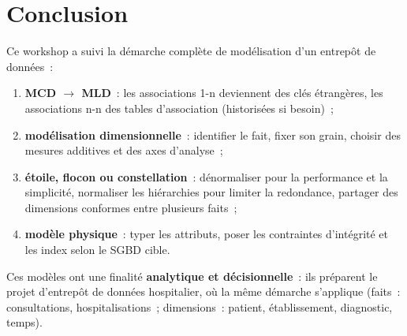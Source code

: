 \newpage
\section*{Conclusion}

\noindent Ce workshop a suivi la démarche complète de modélisation d'un entrepôt de données~:
\begin{enumerate}
	\item \textbf{MCD $\rightarrow$ MLD}~: les associations 1-n deviennent des clés étrangères, les associations n-n des tables d'association (historisées si besoin)~;
	\item \textbf{modélisation dimensionnelle}~: identifier le fait, fixer son grain, choisir des mesures additives et des axes d'analyse~;
	\item \textbf{étoile, flocon ou constellation}~: dénormaliser pour la performance et la simplicité, normaliser les hiérarchies pour limiter la redondance, partager des dimensions conformes entre plusieurs faits~;
	\item \textbf{modèle physique}~: typer les attributs, poser les contraintes d'intégrité et les index selon le SGBD cible.
\end{enumerate}

\noindent Ces modèles ont une finalité \textbf{analytique et décisionnelle}~: ils préparent le projet d'entrepôt de données hospitalier, où la même démarche s'applique (faits~: consultations, hospitalisations~; dimensions~: patient, établissement, diagnostic, temps).
